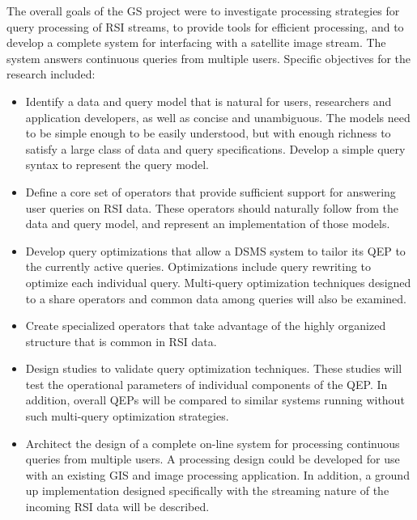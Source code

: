 \documentclass{ucdthesis}       %
\begin{document}
The overall goals of the \ac{GS} project were to investigate
processing strategies for query processing of \ac{RSI} streams, to
provide tools for efficient processing, and to develop a complete
system for interfacing with a satellite image stream.  The system
answers continuous queries from multiple users.  Specific objectives
for the research included:

\begin{itemize}

\item Identify a data and query model that is natural for users,
  researchers and application developers, as well as concise and
  unambiguous.  The models need to be simple enough to be easily
  understood, but with enough richness to satisfy a large class of
  data and query specifications.  Develop a simple query syntax to
  represent the query model.

\item Define a core set of operators that provide sufficient support
  for answering user queries on \ac{RSI} data.  These operators should
  naturally follow from the data and query model, and
  represent an implementation of those models.

\item Develop query optimizations that allow a \ac{DSMS} system to
  tailor its \acf{QEP} to the currently active queries.  Optimizations
  include query rewriting to optimize each individual query.
  Multi-query optimization techniques designed to a share operators
  and common data among queries will also be examined.

\item Create specialized operators that take advantage of the highly
  organized structure that is common in \acf{RSI} data.

\item Design studies to validate query optimization techniques.  These
  studies will test the operational parameters of individual
  components of the \ac{QEP}.  In addition, overall \acp{QEP} will be
  compared to similar systems running without such multi-query
  optimization strategies.

\item Architect the design of a complete on-line system for processing
  continuous queries from multiple users.  A processing design could
  be developed for use with an existing \ac{GIS} and image processing
  application.  In addition, a ground up implementation designed
  specifically with the streaming nature of the incoming \ac{RSI} data
  will be described.

\end{itemize}
\end{document}
